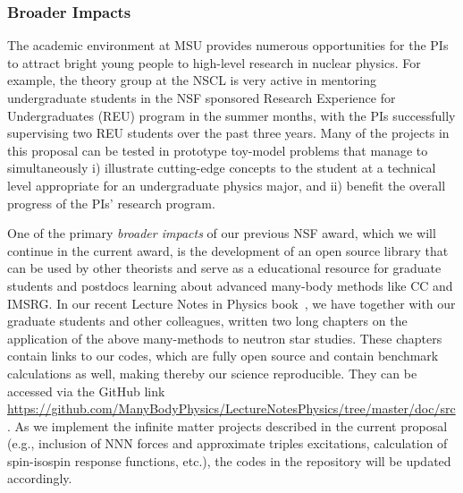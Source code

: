\subsubsection{Broader Impacts}

The academic environment at MSU provides numerous opportunities
for the PIs to attract bright young people to 
high-level research in nuclear physics. For example, the theory group at the NSCL is very active in mentoring undergraduate
students in the NSF sponsored Research Experience for Undergraduates
(REU) program in the summer months, with the PIs successfully supervising two REU students 
over the past three years. Many of the projects in this proposal
can be tested in prototype toy-model problems that manage to
simultaneously i) illustrate cutting-edge concepts to the student at a technical level
appropriate for an undergraduate physics major, and ii) benefit the
overall progress of the PIs' research program. 

One of the primary \emph{broader impacts} of our previous NSF award, which we will continue in the current award, is the development of an
open source library that can be used by other theorists and serve
as a educational resource for graduate students and postdocs learning about 
advanced many-body methods like CC and IMSRG.  In our recent
Lecture Notes in Physics book~\cite{lnp}, we have together with our graduate students
and other colleagues, written two long chapters on the application of
the above many-methods to neutron star studies. These chapters contain
links to our codes, which are fully open source and contain
benchmark calculations as well, making thereby our science
reproducible. They can be accessed via the GitHub
link \url{https://github.com/ManyBodyPhysics/LectureNotesPhysics/tree/master/doc/src}. As we implement the infinite matter projects described in the current proposal (e.g., inclusion of NNN forces and approximate triples excitations, calculation of spin-isospin response functions, etc.), the codes in the repository will be updated accordingly.  

